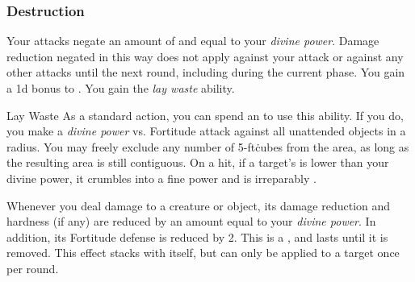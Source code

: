         \subsubsection{Destruction}
             Your attacks negate an amount of  and  equal to your \textit{divine power}.
            Damage reduction negated in this way does not apply against your attack or against any other attacks until the next round, including during the current phase.
             You gain a \plus1d bonus to .
             You gain the \textit{lay waste} ability.
            \begin{ability}{Lay Waste}
                As a standard action, you can spend an  to use this ability.
                If you do, you make a \textit{divine power} vs. Fortitude attack against all unattended objects in a \arealarge radius.
                You may freely exclude any number of 5-ft\. cubes from the area, as long as the resulting area is still contiguous.
                On a hit, if a target's  is lower than your divine power, it crumbles into a fine power and is irreparably .
            \end{ability}
             Whenever you deal damage to a creature or object, its damage reduction and hardness (if any) are reduced by an amount equal to your \textit{divine power}.
            In addition, its Fortitude defense is reduced by 2.
            This is a , and lasts until it is removed.
            This effect stacks with itself, but can only be applied to a target once per round.

